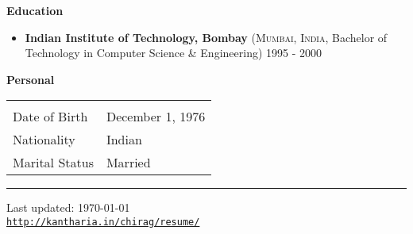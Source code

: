 \documentclass[11pt]{article}
\newcommand{\resheading}[1]{{\large \colorbox{mygrey}{\begin{minipage}{\textwidth}{\textbf{#1 \vphantom{p\^{E}}}}\end{minipage}}}}
\newcommand{\ressubheading}[3]{\item \textbf{#1} (\textsc{#2}, #3) }
\def\footerlink{http://kantharia.in/chirag/resume/}
\begin{document}

\vspace{0.1in}
\resheading{Education}
  \begin{itemize}
  \ressubheading{Indian Institute of Technology, Bombay}
  {Mumbai, India}{Bachelor of Technology in Computer Science \& Engineering}
  {1995 - 2000}
  \end{itemize}

\vspace{0.1in}
\resheading{Personal}
  \begin{tabular*}{0.50\textwidth}{@{\hspace{2em}{\extracolsep{\fill}}} ll }
                  	&  			\\
    Date of Birth 	& December 1, 1976 	\\
    Nationality 	& Indian 		\\
    Marital Status 	& Married 		\\
  \end{tabular*}


\vspace{0.5in}
\rule{\linewidth}{0.5mm}
\begin{center}
  \begin{footnotesize}
    Last updated: \today \\
    \href{\footerlink}{\texttt{\footerlink}}
  \end{footnotesize}
\end{center}
\end{document}
